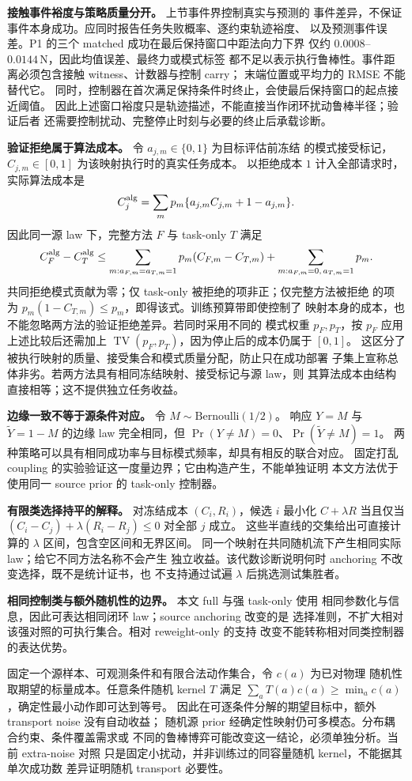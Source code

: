 \textbf{接触事件裕度与策略质量分开。} 上节事件界控制真实与预测的
事件差异，不保证事件本身成功。应同时报告任务失败概率、逐约束轨迹裕度、
以及预测事件误差。P1 的三个 matched 成功在最后保持窗口中距法向力下界
仅约 $0.0008$--$0.0144\,\mathrm N$，因此均值误差、最终力或模式标签
都不足以表示执行鲁棒性。事件距离必须包含接触 witness、计数器与控制 carry；
末端位置或平均力的 RMSE 不能替代它。
同时，控制器在首次满足保持条件时终止，会使最后保持窗口的起点接近阈值。
因此上述窗口裕度只是轨迹描述，不能直接当作闭环扰动鲁棒半径；验证后者
还需要控制扰动、完整停止时刻与必要的终止后承载诊断。

\textbf{验证拒绝属于算法成本。} 令 $a_{j,m}\in\{0,1\}$ 为目标评估前冻结
的模式接受标记，$C_{j,m}\in[0,1]$ 为该映射执行时的真实任务成本。
以拒绝成本 $1$ 计入全部请求时，实际算法成本是
\[
 C_j^{\rm alg}=\sum_m p_m\{a_{j,m}C_{j,m}+1-a_{j,m}\}.
\]
因此同一源 law 下，完整方法 $F$ 与 task-only $T$ 满足
\[
 C_F^{\rm alg}-C_T^{\rm alg}
 \le \sum_{m:a_{F,m}=a_{T,m}=1}p_m(C_{F,m}-C_{T,m})
       +\sum_{m:a_{F,m}=0,\,a_{T,m}=1}p_m.
\]
共同拒绝模式贡献为零；仅 task-only 被拒绝的项非正；仅完整方法被拒绝
的项为 $p_m(1-C_{T,m})\le p_m$，即得该式。训练预算带即使控制了
映射本身的成本，也不能忽略两方法的验证拒绝差异。若同时采用不同的
模式权重 $p_F,p_T$，按 $p_F$ 应用上述比较后还需加上
$\operatorname{TV}(p_F,p_T)$，因为停止后的成本仍属于 $[0,1]$。
这区分了被执行映射的质量、接受集合和模式质量分配，防止只在成功部署
子集上宣称总体非劣。若两方法具有相同冻结映射、接受标记与源 law，则
其算法成本由结构直接相等；这不提供独立任务收益。

\textbf{边缘一致不等于源条件对应。} 令 $M\sim\mathrm{Bernoulli}(1/2)$。
响应 $Y=M$ 与 $\widetilde Y=1-M$ 的边缘 law 完全相同，但
$\Pr(Y\ne M)=0$、$\Pr(\widetilde Y\ne M)=1$。
两种策略可以具有相同成功率与目标模式频率，却具有相反的联合对应。
固定打乱 coupling 的实验验证这一度量边界；它由构造产生，不能单独证明
本文方法优于使用同一 source prior 的 task-only 控制器。

\textbf{有限类选择持平的解释。} 对冻结成本 $(C_i,R_i)$，候选 $i$
最小化 $C+\lambda R$ 当且仅当
$(C_i-C_j)+\lambda(R_i-R_j)\le0$ 对全部 $j$ 成立。
这些半直线的交集给出可直接计算的 $\lambda$ 区间，包含空区间和无界区间。
同一个映射在共同随机流下产生相同实际 law；给它不同方法名称不会产生
独立收益。该代数诊断说明何时 anchoring 不改变选择，既不是统计证书，也
不支持通过试遍 $\lambda$ 后挑选测试集胜者。

\textbf{相同控制类与额外随机性的边界。} 本文 full 与强 task-only 使用
相同参数化与信息，因此可表达相同闭环 law；source anchoring 改变的是
选择准则，不扩大相对该强对照的可执行集合。相对 reweight-only 的支持
改变不能转称相对同类控制器的表达优势。

固定一个源样本、可观测条件和有限合法动作集合，令 $c(a)$ 为已对物理
随机性取期望的标量成本。任意条件随机 kernel $T$ 满足
$\sum_a T(a)c(a)\ge\min_a c(a)$，确定性最小动作即可达到等号。
因此在可逐条件分解的期望目标中，额外 transport noise 没有自动收益；
随机源 prior 经确定性映射仍可多模态。分布耦合约束、条件覆盖需求或
不同的鲁棒博弈可能改变这一结论，必须单独分析。当前 extra-noise 对照
只是固定小扰动，并非训练过的同容量随机 kernel，不能据其单次成功数
差异证明随机 transport 必要性。
